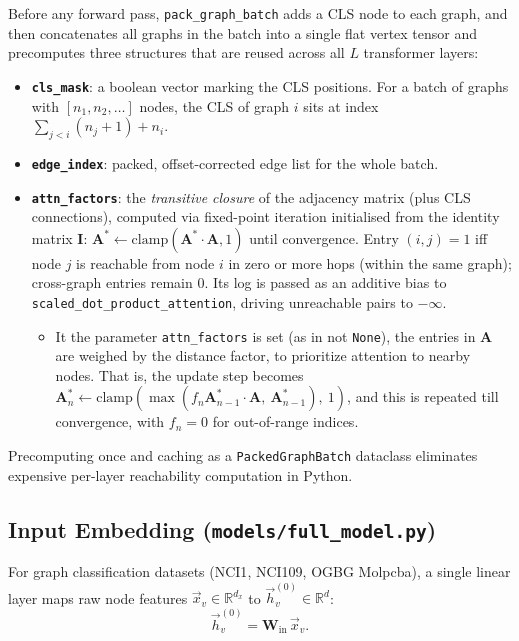 \documentclass[11pt]{article}
\begin{document}
Before any forward pass, \texttt{pack\_graph\_batch} adds a CLS node to each graph, and then concatenates all graphs in the batch into a single flat vertex tensor and precomputes three structures that are reused across all $L$ transformer layers:

\begin{itemize}
    \item \textbf{\texttt{cls\_mask}}: a boolean vector marking the CLS positions. For a batch of graphs with $[n_1, n_2, \ldots]$ nodes, the CLS of graph $i$ sits at index $\sum_{j<i}(n_j+1) + n_i$.
    \item \textbf{\texttt{edge\_index}}: packed, offset-corrected edge list for the whole batch.
    \item \textbf{\texttt{attn\_factors}}: the \emph{transitive closure} of the adjacency matrix (plus CLS connections), computed via fixed-point iteration initialised from the identity matrix $\mathbf{I}$: $\mathbf{A}^* \leftarrow \mathrm{clamp}(\mathbf{A}^*\cdot \mathbf{A}, 1)$ until convergence. Entry $(i,j)=1$ iff node $j$ is reachable from node $i$ in zero or more hops (within the same graph); cross-graph entries remain 0. Its log is passed as an additive bias to \texttt{scaled\_dot\_product\_attention}, driving unreachable pairs to $-\infty$.
    \begin{itemize}
        \item It the parameter \texttt{attn\_factors} is set (as in not \texttt{None}), the entries in $\mathbf{A}$ are weighed by the distance factor, to prioritize attention to nearby nodes. That is, the update step becomes $\mathbf{A}^*_{n} \leftarrow \mathrm{clamp}(\max (f_{n}\mathbf{A}^*_{n-1}\cdot \mathbf{A},\  \mathbf{A}^*_{n-1}),\ 1)$, and this is repeated till convergence, with $f_{n} = 0$ for out-of-range indices.
    \end{itemize}
\end{itemize}

Precomputing once and caching as a \texttt{PackedGraphBatch} dataclass eliminates expensive per-layer reachability computation in Python.

\subsection{Input Embedding (\texttt{models/full\_model.py})}

For graph classification datasets (\textsf{NCI1}, \textsf{NCI109}, \textsf{OGBG Molpcba}), a single linear layer maps raw node features $\vec{x}_v \in \mathbb{R}^{d_x}$ to $\vec{h}^{(0)}_v \in \mathbb{R}^d$:
\[
\vec{h}^{(0)}_v =\mathbf{W}_\text{in}\,\vec{x}_v.
\]
\end{document}
